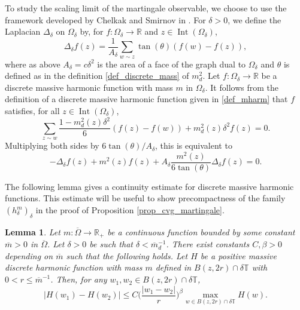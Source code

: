 \documentclass{article}
\newtheorem{lemma}[theorem]{Lemma}
\theoremstyle{definition}
\theoremstyle{remark}
\theoremstyle{remark}
\begin{document}
To study the scaling limit of the martingale observable, we choose to use the framework developed by Chelkak and Smirnov in \cite{Discrete_analysis}. For $\delta > 0$, we define the Laplacian $\Delta_{\delta}$ on $\Omega_{\delta}$ by, for $f: \Omega_{\delta} \to \mathbb{R}$ and $z \in \operatorname{Int}(\Omega_{\delta})$,
\begin{equation*}
    \Delta_{\delta}f(z) = \frac{1}{A_{\delta}} \sum_{w \sim z} \tan(\theta) (f(w) - f(z)),
\end{equation*}
where as above $A_{\delta} = c\delta^2$ is the area of a face of the graph dual to $\Omega_{\delta}$ and $\theta$ is defined as in the definition \eqref{def_discrete_mass} of $m_d^2$. Let $f: \Omega_{\delta} \to \mathbb{R}$ be a discrete massive harmonic function with mass $m$ in $\Omega_{\delta}$. It follows from the definition of a discrete massive harmonic function given in \eqref{def_mharm} that $f$ satisfies, for all $z \in \operatorname{Int}(\Omega_{\delta})$,
\begin{equation*}
    \sum_{z \sim w} \frac{1- m_d^2(z) \delta^2}{6} (f(z)-f(w)) + m_d^2(z) \delta^2 f(z) = 0.
\end{equation*}
Multiplying both sides by $6\tan(\theta)/A_{\delta}$, this is equivalent to
\begin{equation} \label{mharm_approx}
    -\Delta_{\delta} f(z) + m^{2}(z) f(z) + A_{\delta} \frac{m^2(z)}{6\tan(\theta)} \Delta_{\delta} f(z) = 0.
\end{equation}

The following lemma gives a continuity estimate for discrete massive harmonic functions. This estimate will be useful to show precompactness of the family $(h_{\delta}^m)_{\delta}$ in the proof of Proposition \ref{prop_cvg_martingale}. 

\begin{lemma} \label{lemma_equi}
Let $m: \overline{\Omega} \to \mathbb{R}_{+}$ be a continuous function bounded by some constant $\overline{m}>0$ in $\overline{\Omega}$. Let $\delta > 0$ be such that $\delta < \overline{m}_d^{-1}$. There exist constants $C, \beta > 0$ depending on $\overline{m}$ such that the following holds. Let $H$ be a positive massive discrete harmonic function with mass $m$ defined in $B(z,2r) \cap \delta \mathbb{T}$ with $0<r\leq \overline{m}^{-1}$. Then, for any $w_1, w_2 \in B(z,2r) \cap \delta \mathbb{T}$,
\begin{equation*}
    \vert H(w_1) - H(w_2) \vert \leq C \bigg( \frac{\vert w_1 - w_2 \vert}{r} \bigg)^{\beta} \max_{w \in B(z,2r) \cap \delta \mathbb{T}} H(w).
\end{equation*}
\end{lemma}
\end{document}
